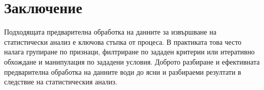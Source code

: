 \section*{Заключение}

Подходящата предварителна обработка на данните за извършване на статистически анализ е ключова стъпка от процеса. В практиката това често налага групиране по признаци, филтриране по зададен критерии или итеративно обхождане и манипулация по зададени условия. Доброто разбиране и ефективната предварителна обработка на данните води до ясни и разбираеми резултати в следствие на статистическия анализ. 

